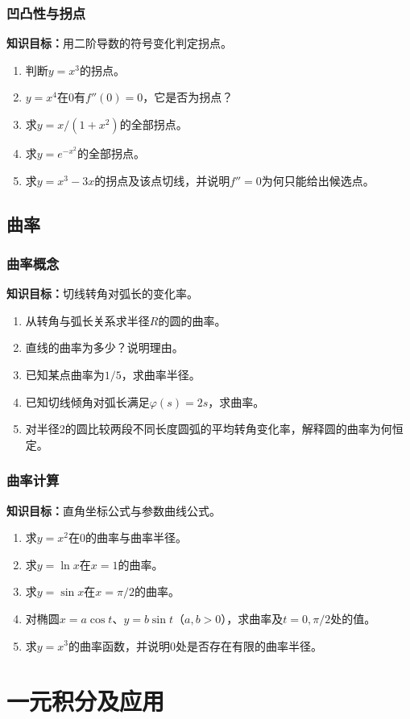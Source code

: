 \documentclass[11pt,a4paper,fontset=fandol]{ctexrep}
\newcommand{\goal}[1]{\textbf{知识目标：}#1\par}
\begin{document}
\subsection{凹凸性与拐点}
\goal{用二阶导数的符号变化判定拐点。}
\begin{enumerate}
\item 判断$y=x^3$的拐点。
\item $y=x^4$在0有$f''(0)=0$，它是否为拐点？
\item 求$y=x/(1+x^2)$的全部拐点。
\item 求$y=e^{-x^2}$的全部拐点。
\item 求$y=x^3-3x$的拐点及该点切线，并说明$f''=0$为何只能给出候选点。
\end{enumerate}
\section{曲率}
\subsection{曲率概念}
\goal{切线转角对弧长的变化率。}
\begin{enumerate}
\item 从转角与弧长关系求半径$R$的圆的曲率。
\item 直线的曲率为多少？说明理由。
\item 已知某点曲率为$1/5$，求曲率半径。
\item 已知切线倾角对弧长满足$\varphi(s)=2s$，求曲率。
\item 对半径2的圆比较两段不同长度圆弧的平均转角变化率，解释圆的曲率为何恒定。
\end{enumerate}
\subsection{曲率计算}
\goal{直角坐标公式与参数曲线公式。}
\begin{enumerate}
\item 求$y=x^2$在0的曲率与曲率半径。
\item 求$y=\ln x$在$x=1$的曲率。
\item 求$y=\sin x$在$x=\pi/2$的曲率。
\item 对椭圆$x=a\cos t$、$y=b\sin t$（$a,b>0$），求曲率及$t=0,\pi/2$处的值。
\item 求$y=x^3$的曲率函数，并说明0处是否存在有限的曲率半径。
\end{enumerate}
\chapter{一元积分及应用}
\end{document}
